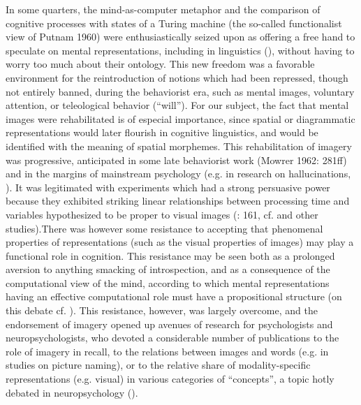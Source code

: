 \documentclass[output=paper]{langscibook}
\begin{document}
In some quarters, the mind-as-computer metaphor and the comparison of cognitive processes with states of a Turing machine (the so-called functionalist view of Putnam 1960) were enthusiastically seized upon as offering a free hand to speculate on mental representations, including in linguistics (\citealt{katz_mentalism_1964}), without having to worry too much about their ontology. This new freedom was a favorable environment for the reintroduction of notions which had been repressed, though not entirely banned, during the behaviorist era, such as mental images, voluntary attention, or teleological behavior (“will”). For our subject, the fact that mental images were rehabilitated is of especial importance, since spatial or diagrammatic representations would later flourish in cognitive linguistics, and would be identified with the meaning of spatial morphemes. This rehabilitation of imagery was progressive, anticipated in some late behaviorist work (Mowrer 1962: 281ff) and in the margins of mainstream psychology (e.g. in research on hallucinations, \citealt{holt_imagery:_1964}). It was legitimated with experiments which had a strong persuasive power because they exhibited striking linear relationships between processing time and variables hypothesized to be proper to visual images (\citealt{baars_cognitive_1986}: 161, cf. \citealt{shepard_mental_1971} and other studies).There was however some resistance to accepting that phenomenal properties of representations (such as the visual properties of images) may play a functional role in cognition. This resistance may be seen both as a prolonged aversion to anything smacking of introspection, and as a consequence of the computational view of the mind, according to which mental representations having an effective computational role must have a propositional structure (on this debate cf. \citealt{fortis_image_1994}). This resistance, however, was largely overcome, and the endorsement of imagery opened up avenues of research for psychologists and neuropsychologists, who devoted a considerable number of publications to the role of imagery in recall, to the relations between images and words (e.g. in studies on picture naming), or to the relative share of modality-specific representations (e.g. visual) in various categories of “concepts”, a topic hotly debated in neuropsychology (\citealt{fortis_signification_1997}).
\end{document}
